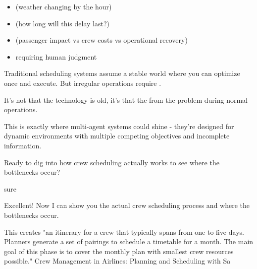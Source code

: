 
\begin{itemize}
\item {} (weather changing by the hour)
\end{itemize}
\begin{itemize}
\item {} (how long will this delay last?)
\end{itemize}
\begin{itemize}
\item {} (passenger impact vs crew costs vs operational recovery)
\end{itemize}
\begin{itemize}
\item {} requiring human judgment
\end{itemize}

 Traditional scheduling systems assume a stable world where you can optimize once and execute. But irregular operations require 
.

 It's not that the technology is old, it's that the 
 from the problem during normal operations.

This is exactly where multi-agent systems could shine - they're designed for dynamic environments with multiple competing objectives and incomplete information.

Ready to dig into how crew scheduling actually works to see where the bottlenecks occur?


sure


Excellent! Now I can show you the actual crew scheduling process and where the bottlenecks occur.


This creates "an itinerary for a crew that typically spans from one to five days. Planners generate a set of pairings to schedule a timetable for a month. The main goal of this phase is to cover the monthly plan with smallest crew resources possible." 
Crew Management in Airlines: Planning and Scheduling with Sa

